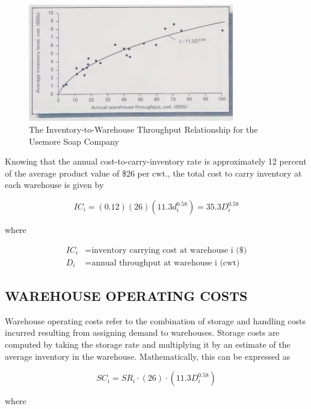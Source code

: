 \documentclass[12pt,a4paper]{article}
\begin{document}
\begin{figure}[!h]
    \centering
    \includegraphics[width=0.8\textwidth]{images/enunciado/figura02.png}
    \caption{The Inventory-to-Warehouse Throughput Relationship for the Usemore Soap Company}\label{fig:figure2Inventory}
\end{figure}

Knowing that the annual cost-to-carry-inventory rate is approximately 12 percent of the average product value of \$26 per cwt., the total cost to carry inventory at each warehouse is given by

\begin{equation}
    IC_{i} = (0.12)(26)(11.3 d_{i}^{0.58}) = 35.3 D_{i}^{0.58}
\end{equation}

where

\begin{align*}
    IC_{i} &= \text{inventory carrying cost at warehouse i (\$)} \\
    D_{i}  &= \text{annual throughput at warehouse i (cwt)}
\end{align*}

\subsection{WAREHOUSE OPERATING COSTS}

Warehouse operating costs refer to the combination of storage and handling costs incurred resulting from assigning demand to warehouses.
Storage costs are computed by taking the storage rate and multiplying it by an estimate of the average inventory in the warehouse.
Mathematically, this can be expressed as

\begin{equation}
    SC_{i} = SR_{i} \cdot (26) \cdot (11.3 D_{i}^{0.58})
\end{equation}

where
\end{document}
